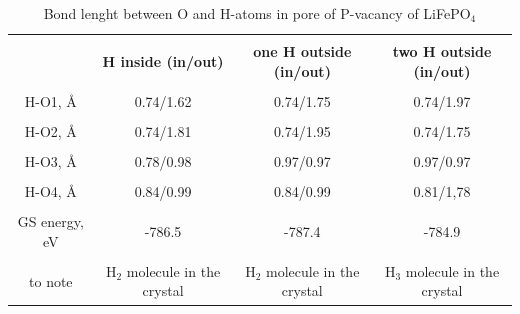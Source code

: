 \begin{table}[h]
\scriptsize{
\caption{Bond lenght between O and H-atoms in pore of P-vacancy of LiFePO$_4$}
\label{Ppos}
\begin{center}
\begin{tabular}{|c|c|c|c|}
\hline
& & & \\
 \textbf{ } & \textbf{H inside (in/out)}& \textbf{one H outside (in/out)} & \textbf{two H outside (in/out)} \\ 
\hline
& & & \\
H-O1, \AA & 0.74/1.62 & 0.74/1.75 & 0.74/1.97\\ 
\hline
& & & \\
H-O2, \AA & 0.74/1.81 & 0.74/1.95 & 0.74/1.75 \\
\hline
& & & \\
H-O3, \AA & 0.78/0.98 & 0.97/0.97  & 0.97/0.97 \\
\hline
& & & \\
H-O4, \AA & 0.84/0.99 & 0.84/0.99 & 0.81/1,78 \\
\hline
& & & \\
GS energy, eV & -786.5 & -787.4 & -784.9 \\
\hline
& & & \\
to note & H$_2$ molecule in the crystal & H$_2$ molecule in the crystal & H$_3$ molecule in the crystal \\
\hline
\end{tabular}
\end{center}
}
\end{table}

